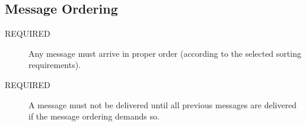 \documentclass[english]{article}
\begin{document}
\subsection{Message Ordering}
\begin{description}
\item[REQUIRED] Any message must arrive in proper order (according to the selected sorting requirements).

\item[REQUIRED] A message must not be delivered until all previous messages are delivered if the message ordering demands so.
\end{description}
\end{document}
